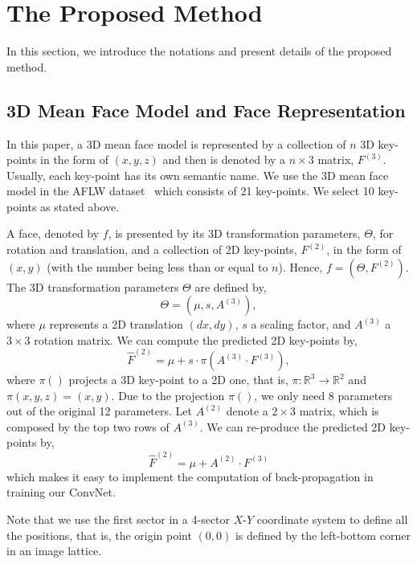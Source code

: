 \documentclass[runningheads]{llncs}
\begin{document}
\section{The Proposed Method}\label{sec:method}
In this section, we introduce the notations and present details of the proposed method.

\subsection{3D Mean Face Model and Face Representation}\label{sec:3Dparameter}
In this paper, a 3D mean face model is represented by a collection of $n$ 3D key-points in the form of $(x, y, z)$ and then is denoted by a $n\times 3$ matrix, $F^{(3)}$. Usually, each key-point has its own semantic name. We use the 3D mean face model in the AFLW dataset~\cite{AFLW} which consists of 21 key-points. We select 10 key-points as stated above.

A face, denoted by $f$, is presented by its 3D transformation parameters, $\Theta$, for rotation and translation, and a collection of 2D key-points, $F^{(2)}$, in the form of $(x, y)$ (with the number being less than or equal to $n$). Hence, $f=(\Theta, F^{(2)})$. The 3D transformation parameters $\Theta$ are defined by,
\begin{equation}
\Theta = (\mu, s, A^{(3)}),
\end{equation}
where $\mu$ represents a 2D translation $(dx, dy)$, $s$ a scaling factor, and $A^{(3)}$ a $3\times 3$ rotation matrix. We can compute the predicted 2D key-points by,
\begin{equation}
\hat{F}^{(2)} = \mu + s\cdot \pi(A^{(3)} \cdot F^{(3)}),
\end{equation}
where $\pi()$ projects a 3D key-point to a 2D one, that is, $\pi: \mathbb{R}^3 \rightarrow \mathbb{R}^2$ and $\pi(x, y, z) = (x, y)$. Due to the projection $\pi()$, we only need 8 parameters out of the original 12 parameters. Let $A^{(2)}$ denote a $2\times 3$ matrix, which is composed by the top two rows of $A^{(3)}$. We can re-produce the predicted 2D key-points by,
 \begin{equation}
 \hat{F}^{(2)} = \mu + A^{(2)} \cdot F^{(3)}
 \label{eqn:Proj3DPnts}
 \end{equation}
which makes it easy to implement the computation of back-propagation in training our ConvNet.

Note that we use the first sector in a 4-sector $X$-$Y$ coordinate system to define all the positions, that is, the origin point $(0, 0)$ is defined by the left-bottom corner in an image lattice.
\end{document}
